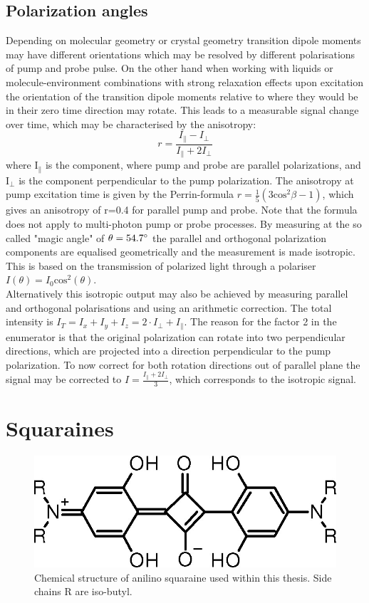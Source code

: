 \documentclass[twoside,openright]{scrreprt}
\begin{document}
\subsection{Polarization angles}\label{sec:PolAngles}
Depending on molecular geometry or crystal geometry transition dipole moments may have different orientations which may be resolved by different polarisations of pump and probe pulse. On the other hand when working with liquids or molecule-environment combinations with strong relaxation effects upon excitation the orientation of the transition dipole moments relative to where they would be in their zero time direction may rotate. This leads to a measurable signal change over time, which may be characterised by the anisotropy:\cite[chapter 10]{Lakowicz2008}
\begin{equation*}
r = \frac{I_{\parallel}-I_{\perp}}{I_{\parallel}+2I_{\perp}}
\end{equation*}
where $\mathrm{I_\parallel}$ is the component, where pump and probe are parallel polarizations, and $\mathrm{I_\perp}$ is the component perpendicular to the pump polarization. The anisotropy at pump excitation time is given by the Perrin-formula $r = \frac{1}{5}\left(3\mathrm{cos^2}\beta-1\right)$, which gives an anisotropy of r=0.4 for parallel pump and probe. Note that the formula does not apply to multi-photon pump or probe processes.  By measuring at the so called "magic angle" of $\theta = 54.7 \degree$ the parallel and orthogonal polarization components are equalised geometrically and the measurement is made isotropic. This is based on the transmission of polarized light through a polariser $I(\theta) = I_0 \mathrm{cos}^2(\theta)$. \cite[chapter 10]{Lakowicz2008}\cite{Schalk2010}\\
Alternatively this isotropic output may also be achieved by measuring parallel and orthogonal polarisations and using an arithmetic correction. The total intensity is $I_T = I_x+I_y+I_z = 2\cdot I_\perp + I_\parallel$. The reason for the factor 2 in the enumerator is that the original polarization can rotate into two perpendicular directions, which are projected into a direction perpendicular to the pump polarization. To now correct for both rotation directions out of parallel plane the signal may be corrected to $I = \frac{I_\parallel + 2I_\perp}{3}$, which corresponds to the isotropic signal.\cite{Zheng2020}



\section{Squaraines}
\begin{figure}[hbtp]
\centering
\includegraphics[width=0.6\linewidth]{images/nAlinoSquaraine.jpeg}
\caption{Chemical structure of anilino squaraine used within this thesis. Side chains R are iso-butyl.\label{fig:chemStructureSQIB}}
\end{figure}
\end{document}
